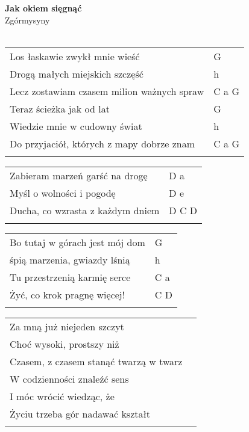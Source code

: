 \documentclass[a5paper]{article}
\begin{document}


\noindent
\fontsize{12pt}{15pt}\selectfont
\textbf{Jak okiem sięgnąć} \\
\fontsize{8pt}{10pt}\selectfont
Zgórmysyny \\ \\
\fontsize{10pt}{12pt}\selectfont
{}
\begin{tabular}{@{}p{8.50cm}p{3cm}@{}}
\noindent
Los łaskawie zwykł mnie wieść & G \\
Drogą małych miejskich szczęść & h \\
Lecz zostawiam czasem milion ważnych spraw & C a G \\
Teraz ścieżka jak od lat & G \\
Wiedzie mnie w cudowny świat & h \\
Do przyjaciół, których z mapy dobrze znam & C a G \\ \\
\end{tabular} 

\noindent
\begin{tabular}{@{}p{7.50cm}p{3cm}@{}}
Zabieram marzeń garść na drogę & D a \\
Myśl o wolności i pogodę & D e \\
Ducha, co wzrasta z każdym dniem & D C D \\ \\
\end{tabular} 

\noindent
\begin{tabular}{@{}p{6.50cm}p{3cm}@{}}
Bo tutaj w górach jest mój dom & G \\
śpią marzenia, gwiazdy lśnią & h \\
Tu przestrzenią karmię serce & C a \\
Żyć, co krok pragnę więcej! & C D \\ \\
\end{tabular} 

\noindent
\begin{tabular}{@{}p{7.50cm}p{3cm}@{}}
Za mną już niejeden szczyt \\
Choć wysoki, prostszy niż \\
Czasem, z czasem stanąć twarzą w twarz \\
W codzienności znaleźć sens \\
I móc wrócić wiedząc, że \\
Życiu trzeba gór nadawać kształt \\ \\
\end{tabular} 
\end{document}
